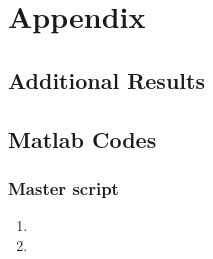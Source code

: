 \graphicspath{{figure_Appendix/}}%

\section{Appendix}
\subsection{Additional Results}
\subsection{Matlab Codes}
\subsubsection{Master script}


\begin{enumerate}
\item 
\item
\end{enumerate}
